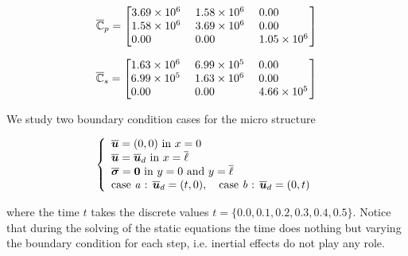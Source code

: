 \documentclass[review]{elsarticle}
\begin{document}
\begin{equation}
\overline{\mathbb{C}}_p = 
  \begin{bmatrix}
   \begin{tabular}{ @{}*{3}{S[round-mode=places,
                    round-integer-to-decimal,round-precision=2,
                    table-format=1.2e4,table-column-width=16mm,table-number-alignment=center]}@{}
		  }
    3.691352e+06 & 1.582008e+06 & 0.0\\
    1.582008e+06 & 3.691352e+06 & 0.0\\
    0.0          & 0.0          & 1.054672e+06
   \end{tabular}
  \end{bmatrix}
\end{equation}

\begin{equation}
  \overline{\mathbb{C}}_s = 
  \begin{bmatrix}
   \begin{tabular}{ @{}*{3}{S[round-mode=places,
                    round-integer-to-decimal,round-precision=2,
                    table-format=1.2e4,table-column-width=16mm,table-number-alignment=center]}@{}
		  }
    1.630150e+06 & 6.986357e+05 & 0.0\\
    6.986357e+05 & 1.630150e+06 & 0.0\\
    0.0          & 0.0          & 4.657572e+05
   \end{tabular}
  \end{bmatrix}
\end{equation}

We study two boundary condition cases for the micro structure

\begin{equation}
\left\{
\begin{array}{ll}
\overline{\bm{u}} = (0,0) \text{ in } x=0\\
\overline{\bm{u}} = \overline{\bm{u}}_d \text{ in } x=\overline{\ell}\\
\overline{\bm{\sigma}} = \bm{0} \text{ in } y=0\text{ and }y=\overline{\ell}\\
\text{case \emph{a} : } \overline{\bm{u}}_d = (t,0) , \quad
\text{case \emph{b} : } \overline{\bm{u}}_d = (0,t)
\end{array}
\right.
\label{micro_eqs}
\end{equation}

\noindent
where the time $t$ takes the discrete values $t = \{ \SI{0.0}, \SI{0.1}, \SI{0.2}, \SI{0.3}, \SI{0.4}, \SI{0.5} \}$.
Notice that during the solving of the static equations the time does nothing but varying the boundary condition
for each step, i.e. inertial effects do not play any role.
\end{document}
